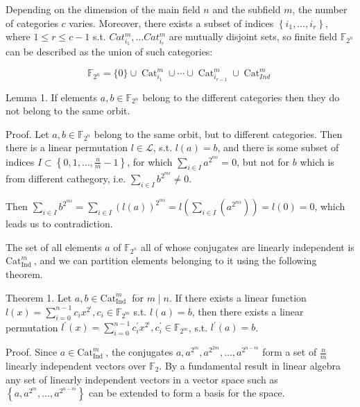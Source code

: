 \documentclass[10pt]{article}
\begin{document}
Depending on the dimension of the main field $n$ and the subfield $m$, the number of categories $c$ varies. Moreover, there exists a subset of indices $\left\{i_{1}, \ldots, i_{r}\right\}$, where $1 \leq r \leq c-1$ s.t. $C a t_{i_{1}}^{m}, \ldots C a t_{i_{r}}^{m}$ are mutually disjoint sets, so finite field $\mathbb{F}_{2^{n}}$ can be described as the union of such categories:


\begin{equation*}
\mathbb{F}_{2^{n}}=\{0\} \cup \operatorname{Cat}_{i_{1}}^{m} \cup \cdots \cup \operatorname{Cat}_{i_{r-1}}^{m} \cup \operatorname{Cat}_{I n d}^{m} \tag{10}
\end{equation*}


Lemma 1. If elements $a, b \in \mathbb{F}_{2^{n}}$ belong to the different categories then they do not belong to the same orbit.

Proof. Let $a, b \in \mathbb{F}_{2^{n}}$ belong to the same orbit, but to different categories. Then there is a linear permutation $l \in \mathcal{L}$, s.t. $l(a)=b$, and there is some subset of indices $I \subset\left\{0,1, \ldots, \frac{n}{m}-1\right\}$, for which $\sum_{i \in I} a^{2^{m i}}=0$, but not for $b$ which is from different cathegory, i.e. $\sum_{i \in I} b^{2^{m i}} \neq 0$.

Then $\sum_{i \in I} b^{2^{m i}}=\sum_{i \in I}(l(a))^{2^{m i}}=l\left(\sum_{i \in I}\left(a^{2^{m i}}\right)\right)=l(0)=0$, which leads us to contradiction.

The set of all elements $a$ of $\mathbb{F}_{2^{n}}$ all of whose conjugates are linearly independent is $\mathrm{Cat}_{\text {Ind }}^{m}$, and we can partition elements belonging to it using the following theorem.

Theorem 1. Let $a, b \in \mathrm{Cat}_{\text {Ind }}^{m}$ for $m \mid n$. If there exists a linear function $l(x)=\sum_{i=0}^{n-1} c_{i} x^{2^{i}}, c_{i} \in \mathbb{F}_{2^{m}}$ s.t. $l(a)=b$, then there exists a linear permutation $l^{\prime}(x)=\sum_{i=0}^{n-1} c_{i}^{\prime} x^{2^{i}}, c_{i}^{\prime} \in \mathbb{F}_{2^{m}}$, s.t. $l^{\prime}(a)=b$.

Proof. Since $a \in \mathrm{Cat}_{\text {Ind }}^{m}$, the conjugates $a, a^{2^{m}}, a^{2^{2 m}}, \ldots, a^{2^{n-m}}$ form a set of $\frac{n}{m}$ linearly independent vectors over $\mathbb{F}_{2}$. By a fundamental result in linear algebra any set of linearly independent vectors in a vector space such as $\left\{a, a^{2^{m}}, \ldots, a^{2^{n-m}}\right\}$ can be extended to form a basis for the space.
\end{document}
